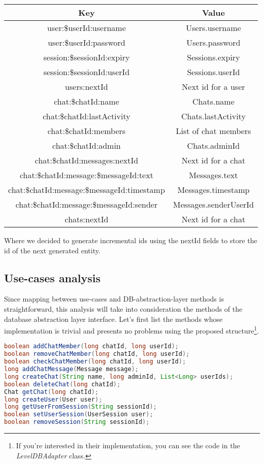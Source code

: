 \documentclass[10pt]{article}
\begin{document}
\begin{center}
\begin{tabular}{ | c | c | }
    \hline
    \textbf{Key} & \textbf{Value} \\\hline
    user:\$userId:username & Users.username \\\hline
    user:\$userId:password & Users.password \\\hline
    session:\$sessionId:expiry & Sessions.expiry \\\hline
    session:\$sessionId:userId & Sessions.userId \\\hline
    users:nextId & Next id for a user \\\hline
    chat:\$chatId:name & Chats.name \\\hline
    chat:\$chatId:lastActivity & Chats.lastActivity \\\hline
    chat:\$chatId:members & List of chat members \\\hline
    chat:\$chatId:admin & Chats.adminId\\\hline
    chat:\$chatId:messages:nextId & Next id for a chat \\\hline
    chat:\$chatId:message:\$messageId:text & Messages.text \\\hline
    chat:\$chatId:message:\$messageId:timestamp & Messages.timestamp \\\hline
    chat:\$chatId:message:\$messageId:sender & Messages.senderUserId \\\hline
    chats:nextId & Next id for a chat \\\hline
\end{tabular}
\end{center}

Where we decided to generate incremental ids using the nextId fields to store 
the id of the next generated entity.

\subsection{Use-cases analysis}
Since mapping between use-cases and DB-abstraction-layer methods is 
straightforward, this analysis will take into consideration the 
methods of the database abstraction layer interface. Let's first list the 
methods whose implementation is trivial and presents no problems using the
proposed structure\footnote{If you're interested in their implementation, you 
can see the code in the \emph{LevelDBAdapter} class.}. 

\begin{lstlisting}[language = Java]
boolean addChatMember(long chatId, long userId);
boolean removeChatMember(long chatId, long userId);
boolean checkChatMember(long chatId, long userId);
long addChatMessage(Message message);
long createChat(String name, long adminId, List<Long> userIds);
boolean deleteChat(long chatId);
Chat getChat(long chatId);
long createUser(User user);
long getUserFromSession(String sessionId);
boolean setUserSession(UserSession user);
boolean removeSession(String sessionId);
\end{lstlisting}
\end{document}
